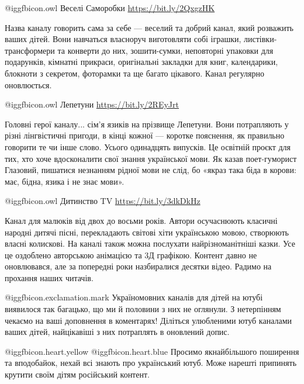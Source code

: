  @igg{fbicon.owl} Веселі Саморобки \url{https://bit.ly/2QxgzHK}

Назва каналу говорить сама за себе — веселий та добрий канал, який розважить
ваших дітей. Вони навчаться власноруч виготовляти собі іграшки,
листівки-трансформери та конверти до них, зошити-сумки, неповторні упаковки для
подарунків, кімнатні прикраси, оригінальні закладки для книг, календарики,
блокноти з секретом, фоторамки та ще багато цікавого. Канал регулярно
оновлюється.

 @igg{fbicon.owl} Лепетуни \url{https://bit.ly/2REyJrt}

Головні герої каналу... сім’я язиків на прізвище Лепетуни. Вони потрапляють у
різні лінгвістичні пригоди, в кінці кожної — коротке пояснення, як правильно
говорити те чи інше слово. Усього одинадцять випусків. Це освітній проєкт для
тих, хто хоче вдосконалити свої знання української мови. Як казав поет-гуморист
Глазовий, пишатися незнанням рідної мови не слід, бо «якраз така біда в корови:
має, бідна, язика і не знає мови».

 @igg{fbicon.owl} Дитинство TV \url{https://bit.ly/3dkDkHz}

Канал для малюків від двох до восьми років. Автори осучаснюють класичні народні
дитячі пісні, перекладають світові хіти українською мовою, створюють власні
колискові. На каналі також можна послухати найрізноманітніші казки. Усе це
оздоблено авторською анімацією та 3Д графікою. Контент давно не оновлювався,
але за попередні роки назбиралися десятки відео. Радимо на прохання наших
читачів.

@igg{fbicon.exclamation.mark} Україномовних каналів для дітей на ютубі виявилося так багацько, що ми й
половини з них не оглянули. З нетерпінням чекаємо на ваші доповнення в
коментарях! Діліться улюбленими ютуб каналами ваших дітей, найцікавіші з них
потраплять в оновлений допис.

@igg{fbicon.heart.yellow}  @igg{fbicon.heart.blue} Просимо якнайбільшого
поширення та вподобайок, нехай всі знають про український ютуб. Може нарешті
припинять крутити своїм дітям російський контент.

